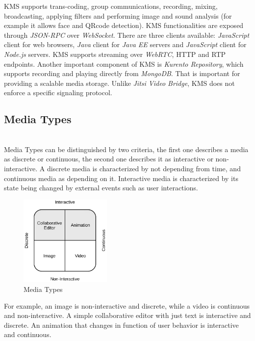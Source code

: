 	
	  \ac{KMS} supports trans-coding, group communications, recording, mixing, broadcasting, applying filters and performing image and sound analysis (for example it allows face and QRcode detection). \ac{KMS} functionalities are exposed through \emph{JSON-RPC} over \emph{WebSocket}.
          There are three clients available: \emph{JavaScript} client for web browsers, \emph{Java} client for \emph{Java EE} servers and \emph{JavaScript} client for \emph{Node.js} servers. 
	\ac{KMS} supports streaming over \emph{WebRTC}, \ac{HTTP} and \ac{RTP} endpoints. Another important component of \ac{KMS} is \emph{Kurento Repository}, which supports recording and playing directly from \emph{MongoDB}. That is important for providing a scalable media storage. Unlike \emph{Jitsi Video Bridge}, \ac{KMS} does not enforce a specific signaling protocol.
	

\subsection{Media Types}\label{mediatype}~\\
	Media Types can be distinguished by two criteria, the first one describes a media as discrete or continuous, the second one describes it as interactive or non-interactive. A discrete media is characterized by not depending from time, and continuous media as depending on it. Interactive media is characterized by its state being changed by external events such as user interactions.
\begin{figure}[!htb]
	\centering
	\includegraphics[width=0.4\textwidth]{figures/media_types.png}
	\caption{Media Types}
\end{figure}
	For example, an image is non-interactive and discrete, while a video is continuous and non-interactive. A simple collaborative editor with just text is interactive and discrete. An animation that changes in function of user behavior is interactive and continuous.

